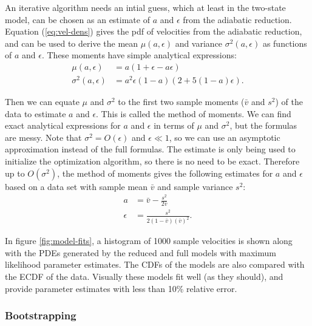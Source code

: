 An iterative algorithm needs an intial guess, which at least in the
two-state model, can be chosen as an estimate of $a$ and $\epsilon$
from the adiabatic reduction. Equation (\ref{eq:vel-dens}) gives the
pdf of velocities from the adiabatic reduction, and can be used to
derive the mean $\mu(a, \epsilon)$ and variance $\sigma^2(a,
\epsilon)$ as functions of $a$ and $\epsilon$. These moments have
simple analytical expressions: 
\begin{align}
  \label{eq:mean-ar}
  \mu(a, \epsilon) &= a(1 + \epsilon - a \epsilon) \\
  \label{eq:var-ar}
  \sigma^2(a, \epsilon) &= a^2 \epsilon (1 - a) (2 + 5(1 - a) \epsilon).
\end{align}

Then we can equate $\mu$ and $\sigma^2$ to the first two sample
moments ($\bar{v}$ and $s^2$) of the data to estimate $a$ and
$\epsilon$. This is called the method of moments. We can find exact
analytical expressions for $a$ and $\epsilon$ in terms of $\mu$ and
$\sigma^2$, but the formulas are messy. Note that
$\sigma^2 = O(\epsilon)$ and $\epsilon \ll 1$, so we can use an
asymptotic approximation instead of the full formulas. The estimate is
only being used to initialize the optimization algorithm, so there is
no need to be exact. Therefore up to $O(\sigma^2)$, the method of
moments gives the following estimates for $a$ and $\epsilon$ based on
a data set with sample mean $\bar{v}$ and sample variance $s^2$:
\begin{align}
  \label{eq:mean-est}
  a &= \bar{v} - \frac{s^2}{2\bar{v}} \\
  \label{eq:var-est}
  \epsilon &= \frac{s^2}{2(1 - \bar{v})(\bar{v})^2}.
\end{align}

In figure \ref{fig:model-fits}, a histogram of 1000 sample velocities
is shown along with the PDEs generated by the reduced and full models
with maximum likelihood parameter estimates. The CDFs of the models
are also compared with the ECDF of the data. Visually these models fit
well (as they should), and provide parameter estimates with less than
10\% relative error.

\subsubsection{Bootstrapping}
\label{sec:bootstrapping}

